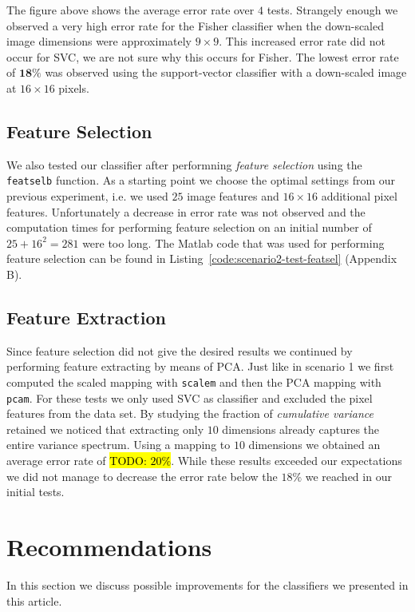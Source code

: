 \documentclass{article}
\newcommand{\todo}[1] {\hl{TODO: #1}}
\begin{document}
The figure above shows the average error rate over $4$ tests. Strangely enough we observed a very high error rate for the Fisher classifier when the down-scaled image dimensions were approximately $9 \times 9$. This increased error rate did not occur for SVC, we are not sure why this occurs for Fisher. The lowest error rate of $\mathbf{18 \%}$ was observed using the support-vector classifier with a down-scaled image at $16 \times 16$ pixels.

\subsection{Feature Selection}

We also tested our classifier after performning \emph{feature selection} using the \texttt{featselb} function. As a starting point we choose the optimal settings from our previous experiment, i.e. we used $25$ image features and $16 \times 16$ additional pixel features. Unfortunately a decrease in error rate was not observed and the computation times for performing feature selection on an initial number of $25 + 16^2 = 281$ were too long. The Matlab code that was used for performing feature selection can be found in Listing~\ref{code:scenario2-test-featsel} (Appendix B).

\subsection{Feature Extraction}

Since feature selection did not give the desired results we continued by performing feature extracting by means of PCA. Just like in scenario 1 we first computed the scaled mapping with \texttt{scalem} and then the PCA mapping with \texttt{pcam}. For these tests we only used SVC as classifier and excluded the pixel features from the data set. By studying the fraction of \emph{cumulative variance} retained we noticed that extracting only $10$ dimensions already captures the entire variance spectrum. Using a mapping to $10$ dimensions we obtained an average error rate of \todo{$20 \%$}. While these results exceeded our expectations we did not manage to decrease the error rate below the $18 \%$ we reached in our initial tests.

\section{Recommendations}

In this section we discuss possible improvements for the classifiers we presented in this article. 
\end{document}

